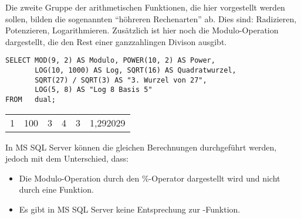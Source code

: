 Die zweite Gruppe der arithmetischen Funktionen, die hier vorgestellt
werden sollen, bilden die sogenannten \enquote{höhreren Rechenarten}
ab. Dies sind: Radizieren, Potenzieren, Logarithmieren. Zusätzlich ist
hier noch die Modulo-Operation dargestellt, die den Rest einer
ganzzahlingen Divison ausgibt.
\begin{lstlisting}[language=oracle_sql,caption={Höhere Rechenarten in Oracle},label=sql03_17]
SELECT MOD(9, 2) AS Modulo, POWER(10, 2) AS Power,
       LOG(10, 1000) AS Log, SQRT(16) AS Quadratwurzel,
       SQRT(27) / SQRT(3) AS "3. Wurzel von 27",
       LOG(5, 8) AS "Log 8 Basis 5"
FROM   dual;
        \end{lstlisting}
\begin{center}
    \begin{small}
        \tablehead{}
        \begin{oraclesql}
            \begin{supertabular}{rrrrrr}
                1 & 100 & 3 & 4 & 3 & 1,292029 \\
            \end{supertabular}
        \end{oraclesql}
    \end{small}
\end{center}
In MS SQL Server können die gleichen Berechnungen durchgeführt
werden, jedoch mit dem Unterschied, dass:
\begin{itemize}
    \item Die Modulo-Operation durch den \%-Operator dargestellt wird und
          nicht durch eine Funktion.
    \item Es gibt in MS SQL Server keine Entsprechung zur
          -Funktion.
\end{itemize}
